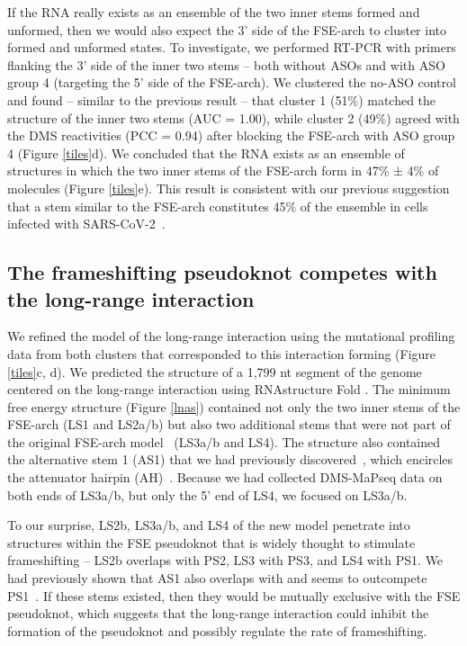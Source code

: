 \documentclass[main.tex]{subfiles}
\begin{document}
If the RNA really exists as an ensemble of the two inner stems formed and unformed, then we would also expect the 3' side of the FSE-arch to cluster into formed and unformed states.
To investigate, we performed RT-PCR with primers flanking the 3' side of the inner two stems -- both without ASOs and with ASO group 4 (targeting the 5' side of the FSE-arch).
We clustered the no-ASO control and found -- similar to the previous result -- that cluster 1 (51\%) matched the structure of the inner two stems (AUC = 1.00), while cluster 2 (49\%) agreed with the DMS reactivities (PCC = 0.94) after blocking the FSE-arch with ASO group 4 (Figure \ref{tiles}d).
We concluded that the RNA exists as an ensemble of structures in which the two inner stems of the FSE-arch form in 47\% ± 4\% of molecules (Figure \ref{tiles}e).
This result is consistent with our previous suggestion that a stem similar to the FSE-arch constitutes 45\% of the ensemble in cells infected with SARS-CoV-2~\cite{Lan2022}.


\subsection{The frameshifting pseudoknot competes with the long-range interaction}

We refined the model of the long-range interaction using the mutational profiling data from both clusters that corresponded to this interaction forming (Figure \ref{tiles}c, d).
We predicted the structure of a 1,799 nt segment of the genome centered on the long-range interaction using RNAstructure Fold \cite{Mathews2004a}.
The minimum free energy structure (Figure \ref{lnas}) contained not only the two inner stems of the FSE-arch (LS1 and LS2a/b) but also two additional stems that were not part of the original FSE-arch model~\cite{Ziv2020} (LS3a/b and LS4).
The structure also contained the alternative stem 1 (AS1) that we had previously discovered~\cite{Lan2022}, which encircles the attenuator hairpin (AH)~\cite{Su2005}.
Because we had collected DMS-MaPseq data on both ends of LS3a/b, but only the 5' end of LS4, we focused on LS3a/b.

To our surprise, LS2b, LS3a/b, and LS4 of the new model penetrate into structures within the FSE pseudoknot that is widely thought to stimulate frameshifting -- LS2b overlaps with PS2, LS3 with PS3, and LS4 with PS1.
We had previously shown that AS1 also overlaps with and seems to outcompete PS1~\cite{Lan2022}.
If these stems existed, then they would be mutually exclusive with the FSE pseudoknot, which suggests that the long-range interaction could inhibit the formation of the pseudoknot and possibly regulate the rate of frameshifting.
\end{document}
